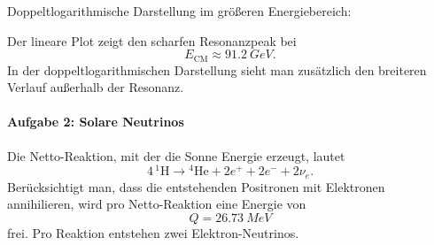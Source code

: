 \documentclass[11pt,a4paper]{scrartcl}
\begin{document}
\begin{enumerate}[label=(\alph*)]
\begin{calculationbox}
                \begin{calculationbox}
                    Doppeltlogarithmische Darstellung im größeren Energiebereich:
                    \begin{center}
                    \end{center}
                \end{calculationbox}
            \end{calculationbox}

            \begin{answerbox}
                Der lineare Plot zeigt den scharfen Resonanzpeak bei
                \[
                    E_{\mathrm{CM}}\approx\SI{91.2}{GeV}.
                \]
                In der doppeltlogarithmischen Darstellung sieht man zusätzlich den breiteren
                Verlauf außerhalb der Resonanz.
            \end{answerbox}
    \end{enumerate}

    \newpage
    \paragraph{Aufgabe 2: Solare Neutrinos}

    Die Netto-Reaktion, mit der die Sonne Energie erzeugt, lautet
    \[
        4\,{}^1\mathrm{H}\rightarrow{}^4\mathrm{He}+2e^++2e^-+2\nu_e.
    \]
    Berücksichtigt man, dass die entstehenden Positronen mit Elektronen annihilieren,
    wird pro Netto-Reaktion eine Energie von
    \[
        Q=\SI{26.73}{MeV}
    \]
    frei. Pro Reaktion entstehen zwei Elektron-Neutrinos.
\end{document}
